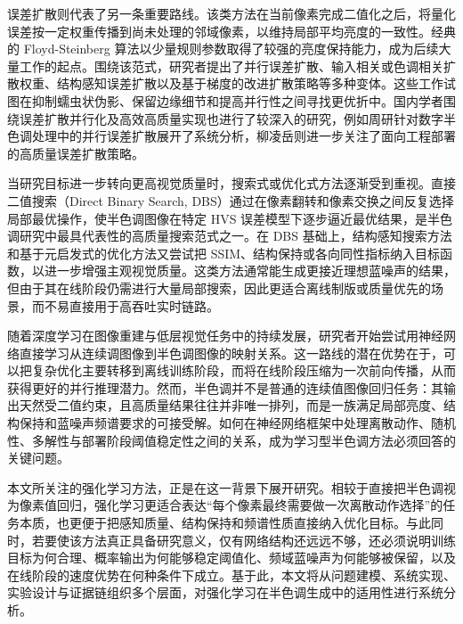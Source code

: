 \documentclass[thesis]{../zstucs-graduation-project}
\begin{document}
误差扩散则代表了另一条重要路线。该类方法在当前像素完成二值化之后，将量化误差按一定权重传播到尚未处理的邻域像素，以维持局部平均亮度的一致性。经典的 Floyd-Steinberg 算法以少量规则参数取得了较强的亮度保持能力，成为后续大量工作的起点\cite{FLOYD1976An}。围绕该范式，研究者提出了并行误差扩散\cite{METAXAS1998Optimal}、输入相关或色调相关扩散权重\cite{OSTROMOUKHOV2001A,LI2004Tone}、结构感知误差扩散\cite{CHANG2009Structure}以及基于梯度的改进扩散策略\cite{HU2016Simple}等多种变体。这些工作试图在抑制蠕虫状伪影、保留边缘细节和提高并行性之间寻找更优折中。国内学者围绕误差扩散并行化及高效高质量实现也进行了较深入的研究，例如周研针对数字半色调处理中的并行误差扩散展开了系统分析，柳凌岳则进一步关注了面向工程部署的高质量误差扩散策略\cite{周研2011数字半色调处理的并行误差扩散算法研究,柳凌岳2014基于误差扩散的高效高质量半色调技术研究}。

当研究目标进一步转向更高视觉质量时，搜索式或优化式方法逐渐受到重视。直接二值搜索（Direct Binary Search, DBS）通过在像素翻转和像素交换之间反复选择局部最优操作，使半色调图像在特定 HVS 误差模型下逐步逼近最优结果，是半色调研究中最具代表性的高质量搜索范式之一\cite{ANALOUI1992Model}。在 DBS 基础上，结构感知搜索方法和基于元启发式的优化方法又尝试把 SSIM、结构保持或各向同性指标纳入目标函数，以进一步增强主观视觉质量\cite{PANG2008Structure,CHATTERJEE2012Towards}。这类方法通常能生成更接近理想蓝噪声的结果，但由于其在线阶段仍需进行大量局部搜索，因此更适合离线制版或质量优先的场景，而不易直接用于高吞吐实时链路。

随着深度学习在图像重建与低层视觉任务中的持续发展，研究者开始尝试用神经网络直接学习从连续调图像到半色调图像的映射关系\cite{CHOI2022Mimicking,LAU2023Taming,XIA2021Deep}。这一路线的潜在优势在于，可以把复杂优化主要转移到离线训练阶段，而将在线阶段压缩为一次前向传播，从而获得更好的并行推理潜力。然而，半色调并不是普通的连续值图像回归任务：其输出天然受二值约束，且高质量结果往往并非唯一排列，而是一族满足局部亮度、结构保持和蓝噪声频谱要求的可接受解。如何在神经网络框架中处理离散动作、随机性、多解性与部署阶段阈值稳定性之间的关系，成为学习型半色调方法必须回答的关键问题。

本文所关注的强化学习方法，正是在这一背景下展开研究。相较于直接把半色调视为像素值回归，强化学习更适合表达“每个像素最终需要做一次离散动作选择”的任务本质，也更便于把感知质量、结构保持和频谱性质直接纳入优化目标。与此同时，若要使该方法真正具备研究意义，仅有网络结构还远远不够，还必须说明训练目标为何合理、概率输出为何能够稳定阈值化、频域蓝噪声为何能够被保留，以及在线阶段的速度优势在何种条件下成立。基于此，本文将从问题建模、系统实现、实验设计与证据链组织多个层面，对强化学习在半色调生成中的适用性进行系统分析。
\end{document}
